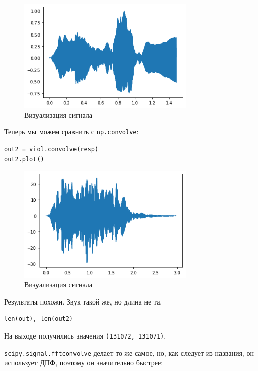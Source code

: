 \documentclass[a4paper,12pt]{report}
\begin{document}
\begin{figure}[H]
        \centering
        \includegraphics[width=0.75\textwidth]{6.png}
        \caption{Визуализация сигнала}
        \label{6}
\end{figure}

Теперь мы можем сравнить с \texttt{np.convolve}:

\begin{lstlisting}[caption=Объединение сигналов]
out2 = viol.convolve(resp)
out2.plot()
\end{lstlisting}

\begin{figure}[H]
        \centering
        \includegraphics[width=0.75\textwidth]{7.png}
        \caption{Визуализация сигнала}
        \label{7}
\end{figure}

Результаты похожи. Звук такой же, но длина не та.

\begin{lstlisting}[caption=Сравнение длин сигналов]
len(out), len(out2)
\end{lstlisting}

На выходе получились значения \texttt{(131072, 131071)}.

\texttt{scipy.signal.fftconvolve} делает то же самое, но, как следует из названия, он использует ДПФ, поэтому он значительно быстрее:
\end{document}
